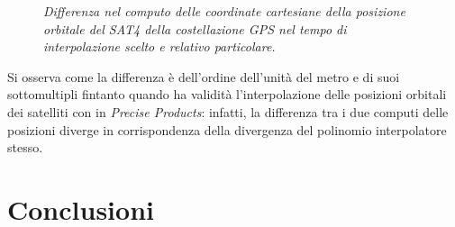 \documentclass[a4paper,11pt,twoside]{book}
\begin{document}
	
	\begin{figure}[H]
		\centering
		\qquad
		\vspace{-0.3cm}
		\caption{\textit{Differenza nel computo delle coordinate cartesiane della posizione orbitale del SAT4 della costellazione GPS nel tempo di interpolazione scelto e relativo particolare.}}
		\label{diff}
	\end{figure}

	Si osserva come la differenza è dell'ordine dell'unità del metro e di suoi sottomultipli fintanto quando ha validità l'interpolazione delle posizioni orbitali dei satelliti con in \textit{Precise Products}: infatti, la differenza tra i due computi delle posizioni diverge in corrispondenza della divergenza del polinomio interpolatore stesso.
	
	\section{Conclusioni}
	
\end{document}
